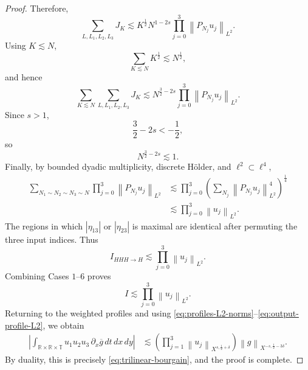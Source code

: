 \documentclass[12pt,oneside,reqno]{amsart}
\numberwithin{equation}{section}
\theoremstyle{plain}
\def\R{{\mathbb R}}
\def\T{{\mathbb T}}
\newcommand{\abs}[1]{%
    \left|#1\right|%
}
\def\pt{\partial}
\newcommand{\Lpn}[2]{%
    \left\lVert #1\right\rVert_{L^{#2}}%
}
\newcommand{\xnorm}[3]{%
    \left\lVert #1\right\rVert_{X^{{#2},{#3}}}%
}
\newcommand{\Ifr}[4]{%
    I_{{#1}{#2}{#3}\to{#4}}%
}
\newcommand{\Ls}{{L,L_1,L_2,L_3}}
\begin{document}
\begin{proof}
Therefore,
\begin{equation}
\label{eq:case6-after-modulation}
    \sum_{\Ls}J_K
    \lesssim
    K^{\frac12}
    N^{1-2s}
    \prod_{j=0}^3
    \Lpn{P_{N_j}u_j}{2}.
\end{equation}
Using $K\lesssim N$,
\begin{equation}
    \sum_{K\lesssim N}
    K^{\frac12}
    \lesssim
    N^{\frac12},
\end{equation}
and hence
\begin{equation}
\label{eq:case6-after-K}
    \sum_{K\lesssim N}
    \sum_{\Ls}J_K
    \lesssim
    N^{\frac32-2s}
    \prod_{j=0}^3
    \Lpn{P_{N_j}u_j}{2}.
\end{equation}
Since $s>1$,
\begin{equation}
    \frac32-2s<-\frac12,
\end{equation}
so
\begin{equation}
    N^{\frac32-2s}
    \lesssim1.
\end{equation}
Finally, by bounded dyadic multiplicity, discrete H\"older, and
$\ell^2\subset\ell^4$,
\begin{align}
\sum_{N_1\sim N_2\sim N_3\sim N}
\prod_{j=0}^3
\Lpn{P_{N_j}u_j}{2}
&\lesssim
\prod_{j=0}^3
\left(
    \sum_{N_j}
    \Lpn{P_{N_j}u_j}{2}^4
\right)^{\frac14}
\nonumber\\
&\lesssim
\prod_{j=0}^3
\Lpn{u_j}{2}.
\end{align}
The regions in which $\abs{\eta_{13}}$ or $\abs{\eta_{23}}$ is
maximal are identical after permuting the three input indices.
Thus
\begin{equation}
\label{eq:case6-final}
    \Ifr{H}{H}{H}{H}
    \lesssim
    \prod_{j=0}^3
    \Lpn{u_j}{2}.
\end{equation}
Combining Cases $1$--$6$ proves
\begin{equation}
    I
    \lesssim
    \prod_{j=0}^3
    \Lpn{u_j}{2}.
\end{equation}
Returning to the weighted profiles and using
\eqref{eq:profiles-L2-norms}--\eqref{eq:output-profile-L2}, we obtain
\begin{equation}
\begin{aligned}
    \left|
    \int_{\R\times\R\times\T}
        u_1u_2u_3\,\pt_x\overline g
        \,dt\,dx\,dy
    \right|
    &\lesssim
    \left(
        \prod_{j=1}^3
        \xnorm{u_j}{s}{\frac12+\delta}
    \right)
    \xnorm{g}{-s}{\frac12-3\delta}.
\end{aligned}
\end{equation}
By duality, this is precisely
\eqref{eq:trilinear-bourgain}, and the proof is complete.
\end{proof}
\end{document}
